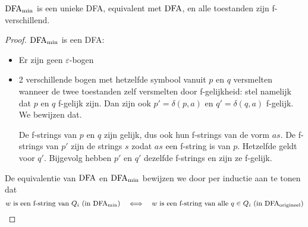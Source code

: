 \documentclass[../aanvullingen_cursus.tex]{subfiles}
\begin{document}
\begin{stelling}
	\(\text{DFA}_{\text{min}}\) is een unieke DFA, equivalent met \(\text{DFA}\), en alle toestanden zijn f-verschillend.
\end{stelling}

\begin{proof}

	\(\text{DFA}_{\text{min}}\) is een DFA:
	\begin{itemize}
		\item Er zijn geen \(\varepsilon\)-bogen
		\item 2 verschillende bogen met hetzelfde symbool vanuit \(p\) en \(q\)  versmelten wanneer de twee toestanden zelf versmelten door f-gelijkheid:
		stel namelijk dat \(p\) en \(q\) f-gelijk zijn. Dan zijn ook \( p'=\delta(p,a) \) en \( q'=\delta(q,a) \) f-gelijk. We bewijzen dat.

		De f-strings van \(p\) en \(q\) zijn gelijk, dus ook hun f-strings van de vorm \(as\). De f-strings van \(p'\) zijn de strings \( s \) zodat \( as \) een f-string is van \( p \). Hetzelfde geldt voor \( q' \). Bijgevolg hebben \( p' \) en \( q' \) dezelfde f-strings en zijn ze f-gelijk.
	\end{itemize}

	De equivalentie van \(\text{DFA}\) en \(\text{DFA}_{\text{min}}\) bewijzen we door per inductie aan te tonen dat \[ w \text{ is een f-string van } Q_i \text{ (in } \text{DFA}_{\text{min}} \text{)} \quad \Longleftrightarrow \quad w \text{ is een f-string van alle } q\in Q_i \text{ (in } \text{DFA}_{\text{origineel}} \text{)}\]


\end{proof}
\end{document}
